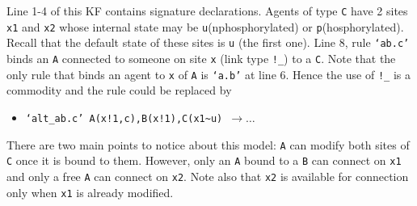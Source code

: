 \documentclass[11pt]{book}
\def\int{\hbox{\texttt{\~}}}
\def\ttt#1{\texttt{#1}}
\def\rar{\rightarrow}
\def\ITE#1{\begin{itemize}#1\end{itemize}}
\begin{document}
Line 1-4 of this KF contains signature declarations. Agents of type \ttt{C} have 2 sites \ttt{x1} and \ttt{x2} whose internal state may be \ttt{u}(nphosphorylated) or \ttt{p}(hosphorylated). Recall that the default state of these sites is \ttt{u} (the first one). Line 8, rule \ttt{`ab.c'} binds an \ttt{A} connected to someone on site \ttt{x} (link type \ttt{!\_}) to a \ttt{C}. Note that the only rule that binds an agent to \ttt{x} of \ttt{A} is \ttt{`a.b'} at line 6. Hence the use of \ttt{!\_} is a commodity and the rule could be replaced by 
\ITE{
\item[]\ttt{`alt\_ab.c' A(x!1,c),B(x!1),C(x1\int u) $\rar\dots$}
}
There are two main points to notice about this model: \ttt{A} can modify both sites of \ttt{C} once it is bound to them. However, only an \ttt{A} bound to a \ttt{B} can connect on \ttt{x1} and only a free \ttt{A} can connect on \ttt{x2}. Note also that \ttt{x2} is available for connection only when \ttt{x1} is already modified. 
\end{document}
